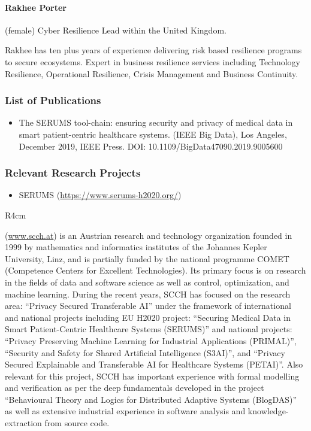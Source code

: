 \documentclass[a4paper,11pt]{article}
\begin{document}
\paragraph{Rakhee Porter}  (female) Cyber Resilience Lead within the United Kingdom.

Rakhee has ten plus years of experience delivering risk based resilience programs to secure ecosystems. Expert in business resilience services including Technology Resilience, Operational Resilience, Crisis Management and Business Continuity.

\subsubsection*{List of Publications}

\begin{itemize}
\item The SERUMS tool-chain: ensuring security and privacy of medical data in smart patient-centric healthcare systems. (IEEE Big Data), Los Angeles, December 2019, IEEE Press. DOI: 10.1109/BigData47090.2019.9005600
\end{itemize}

\subsubsection*{Relevant Research Projects}
\begin{itemize}
\item SERUMS (\url{https://www.serums-h2020.org/})
\end{itemize}



\begin{wrapfigure}{R}{4cm}
\vspace{-2cm}
\hfill {}
\vspace{-1cm}
\end{wrapfigure}

\SCCH{} (\url{www.scch.at}) is an Austrian research and technology organization founded in 1999 by mathematics and informatics institutes of the Johannes Kepler University, Linz, and is partially funded by the national programme COMET (Competence Centers for Excellent Technologies). Its primary focus is on research in the fields of data and software science as well as control, optimization, and machine learning. During the recent years, SCCH has focused on the research area: ``Privacy Secured Transferable AI'' under the framework of international and national projects including EU H2020 project: ``Securing Medical Data in Smart Patient-Centric Healthcare Systems (SERUMS)'' and national projects: ``Privacy Preserving Machine Learning for Industrial Applications (PRIMAL)'', ``Security and Safety for Shared Artificial Intelligence (S3AI)'', and ``Privacy Secured Explainable and Transferable AI for Healthcare Systems (PETAI)''. Also relevant for this project, SCCH has important experience with formal modelling and verification as per the deep fundamentals developed in the project ``Behavioural Theory and Logics for Distributed Adaptive Systems (BlogDAS)'' as well as extensive industrial experience in software analysis and knowledge-extraction from source code. 
\end{document}
